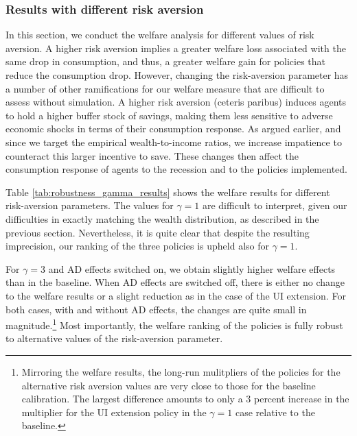 \documentclass[../HAFiscal]{subfiles}
\begin{document}
\subsubsection{Results with different risk aversion}
\label{sec:robust_gamma_results}

In this section, we conduct the welfare analysis for different values of risk aversion. A higher risk aversion implies a greater welfare loss associated with the same drop in consumption, and thus, a greater welfare gain for policies that reduce the consumption drop. However, changing the risk-aversion parameter has a number of other ramifications for our welfare measure that are difficult to assess without simulation. A higher risk aversion (ceteris paribus) induces agents to hold a higher buffer stock of savings, making them less sensitive to adverse economic shocks in terms of their consumption response. As argued earlier, and since we target the empirical wealth-to-income ratios, we increase impatience to counteract this larger incentive to save. These changes then affect the consumption response of agents to the recession and to the policies implemented. 

Table \ref{tab:robustness_gamma_results} shows the welfare results for different risk-aversion parameters. The values for $\gamma = 1$ are difficult to interpret, given our difficulties in exactly matching the wealth distribution, as described in the previous section. Nevertheless, it is quite clear that despite the resulting imprecision, our ranking of the three policies is upheld also for $\gamma=1$.

For $\gamma=3$ and AD effects switched on, we obtain slightly higher welfare effects than in the baseline. When AD effects are switched off, there is either no change to the welfare results or a slight reduction as in the case of the UI extension. For both cases, with and without AD effects, the changes are quite small in magnitude.\footnote{Mirroring the welfare results, the long-run mulitpliers of the policies for the alternative risk aversion values are very close to those for the baseline calibration. The largest difference amounts to only a 3 percent increase in the multiplier for the UI extension policy in the $\gamma = 1$ case relative to the baseline.} Most importantly, the welfare ranking of the policies is fully robust to alternative values of the risk-aversion parameter.
\end{document}
